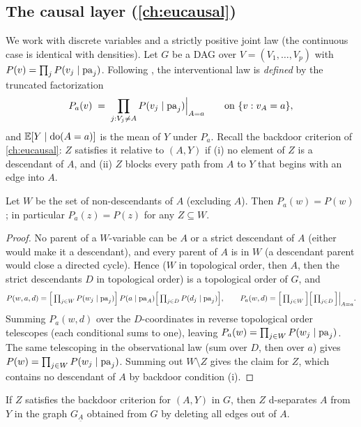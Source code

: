 \subsection{The causal layer (\cref{ch:eucausal})}

We work with discrete variables and a strictly positive joint law (the continuous case is identical
with densities). Let $G$ be a DAG over $V = (V_1, \dots, V_p)$ with $P(v) = \prod_j P(v_j \mid
\mathrm{pa}_j)$. Following \citet{pearl1995}, the interventional law is \emph{defined} by the
truncated factorization
\begin{equation}
\label{eq:app:pf:trunc}
P_a(v) \;=\; \prod_{j : V_j \ne A} P(v_j \mid \mathrm{pa}_j) \Big|_{A = a}
\qquad \text{on } \{v : v_A = a\},
\end{equation}
and $\mathbb{E}[Y \mid \mathrm{do}(A=a)]$ is the mean of $Y$ under $P_a$. Recall the backdoor criterion of
\cref{ch:eucausal}: $Z$ satisfies it relative to $(A, Y)$ if (i) no element of $Z$ is a descendant of
$A$, and (ii) $Z$ blocks every path from $A$ to $Y$ that begins with an edge into $A$.
\begin{lemma}
\label{app:pf:truncmarg}
Let $W$ be the set of non-descendants of $A$ (excluding $A$). Then $P_a(w) = P(w)$; in particular
$P_a(z) = P(z)$ for any $Z \subseteq W$.
\end{lemma}
\begin{proof}
No parent of a $W$-variable can be $A$ or a strict descendant of $A$ (either would make it a
descendant), and every parent of $A$ is in $W$ (a descendant parent would close a directed cycle).
Hence ($W$ in topological order, then $A$, then the strict descendants $D$ in topological order) is a
topological order of $G$, and
\[
P(w, a, d) = \Big[\textstyle\prod_{j \in W} P(w_j \mid \mathrm{pa}_j)\Big]\, P(a \mid \mathrm{pa}_A)
\Big[\textstyle\prod_{j \in D} P(d_j \mid \mathrm{pa}_j)\Big],
\qquad
P_a(w, d) = \Big[\textstyle\prod_{j \in W}\Big]\Big[\textstyle\prod_{j \in D}\Big]\Big|_{A=a}.
\]
Summing $P_a(w,d)$ over the $D$-coordinates in reverse topological order telescopes (each conditional
sums to one), leaving $P_a(w) = \prod_{j \in W} P(w_j \mid \mathrm{pa}_j)$. The same telescoping in the
observational law (sum over $D$, then over $a$) gives $P(w) = \prod_{j \in W} P(w_j \mid
\mathrm{pa}_j)$. Summing out $W \setminus Z$ gives the claim for $Z$, which contains no descendant of
$A$ by backdoor condition (i).
\end{proof}
\begin{lemma}
\label{app:pf:block}
If $Z$ satisfies the backdoor criterion for $(A, Y)$ in $G$, then $Z$ d-separates $A$ from $Y$ in the
graph $G_{\underline{A}}$ obtained from $G$ by deleting all edges out of $A$.
\end{lemma}
